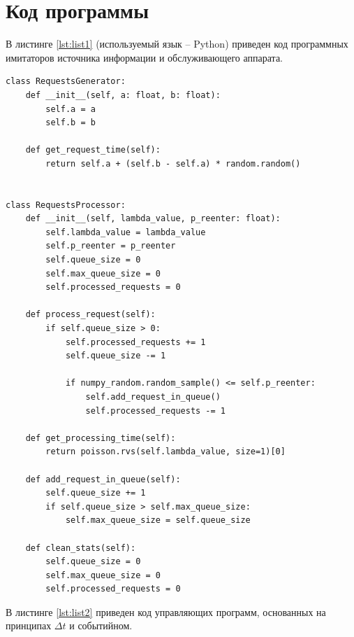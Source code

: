 \documentclass[14pt, a4paper]{extarticle}
\begin{document}
\section{Код программы}

В листинге \ref{lst:list1} (используемый язык -- Python) приведен код программных имитаторов источника информации и обслуживающего аппарата. 

\begin{lstlisting}[caption = {Код программных имитаторов источника информации и обслуживающего аппарата}, label=lst:list1]
class RequestsGenerator:
	def __init__(self, a: float, b: float):
		self.a = a
		self.b = b
	
	def get_request_time(self):
		return self.a + (self.b - self.a) * random.random()


class RequestsProcessor:
	def __init__(self, lambda_value, p_reenter: float):
		self.lambda_value = lambda_value
		self.p_reenter = p_reenter
		self.queue_size = 0
		self.max_queue_size = 0
		self.processed_requests = 0
	
	def process_request(self):
		if self.queue_size > 0:
			self.processed_requests += 1
			self.queue_size -= 1
			
			if numpy_random.random_sample() <= self.p_reenter:
				self.add_request_in_queue()
				self.processed_requests -= 1
	
	def get_processing_time(self):
		return poisson.rvs(self.lambda_value, size=1)[0]
	
	def add_request_in_queue(self):
		self.queue_size += 1
		if self.queue_size > self.max_queue_size:
			self.max_queue_size = self.queue_size
	
	def clean_stats(self):
		self.queue_size = 0
		self.max_queue_size = 0
		self.processed_requests = 0
\end{lstlisting}

В листинге \ref{lst:list2} приведен код управляющих программ, основанных на принципах $\Delta t$ и событийном. 
\end{document}
